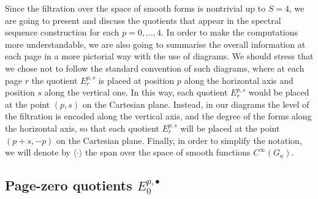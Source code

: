 \documentclass[10pt]{amsart}
\theoremstyle{remark}
\numberwithin{equation}{section}
\begin{document}
Since the filtration over the space of smooth forms is nontrivial up to $S=4$, we are going to present and discuss the quotients that appear in the spectral sequence construction for each $p=0,\ldots,4$. In order to make the computations more understandable, we are also going to summarise the overall information at each page in a more pictorial way with the use of diagrams. We should stress that we chose not to follow the standard convention of such diagrams, where at each page $r$ the quotient $E^{p,s}_r$ is placed at position $p$ along the horizontal axis and position $s$ along the vertical one. In this way, each quotient $E_r^{p,s}$ would be placed at the point $(p,s)$ on the Cartesian plane. Instead, in our diagrams the level of the filtration is encoded along the vertical axis, and the degree of the forms along the horizontal axis, so that each quotient $E^{p,s}_r$ will be placed at the point $(p+s,-p)$ on the Cartesian plane. Finally, in order to simplify the notation, we will denote by $\langle\cdot\rangle$ the span over the space of smooth functions $C^\infty(G_\kappa)$.

\setcounter{subsection}{-1}

\subsection{Page-zero quotients $E_0^{p,\bullet}$}
\end{document}
